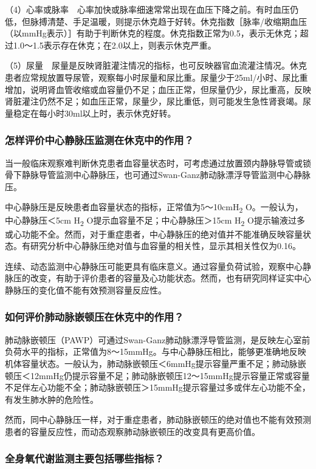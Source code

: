 （4）心率或脉率　心率加快或脉率细速常常出现在血压下降之前。有时血压仍低，但脉搏清楚、手足温暖，则提示休克趋于好转。休克指数［脉率/收缩期血压（以mmHg表示）］有助于判断休克的程度。休克指数正常为0.5，表示无休克；超过1.0～1.5表示存在休克；在2.0以上，则表示休克严重。

（5）尿量　尿量是反映肾脏灌注情况的指标，也可反映器官血流灌注情况。休克患者应常规放置导尿管，观察每小时尿量和尿比重。尿量少于25ml/小时、尿比重增加，说明肾血管收缩或血容量仍不足；血压正常，但尿量仍少，尿比重高，反映肾脏灌注仍然不足；如血压正常，尿量少，尿比重低，则可能发生急性肾衰竭。尿量稳定在每小时30ml以上时，表示休克好转。

\subsubsection{怎样评价中心静脉压监测在休克中的作用？}

当一般临床观察难判断休克患者血容量状态时，可考虑通过放置颈内静脉导管或锁骨下静脉导管监测中心静脉压，也可通过Swan-Ganz肺动脉漂浮导管监测中心静脉压。

中心静脉压是反映患者血容量状态的指标，正常值为5～10cmH\textsubscript{2}
O。一般认为，中心静脉压＜5cm H\textsubscript{2}
O提示血容量不足；中心静脉压＞15cm H\textsubscript{2}
O提示输液过多或心功能不全。然而，对于重症患者，中心静脉压的绝对值并不能准确反映容量状态。有研究分析中心静脉压绝对值与血容量的相关性，显示其相关性仅为0.16。

连续、动态监测中心静脉压可能更具有临床意义。通过容量负荷试验，观察中心静脉压的改变，有助于评价患者的容量及心功能状态。然而，也有研究同样证实中心静脉压的变化值不能有效预测容量反应性。

\subsubsection{如何评价肺动脉嵌顿压在休克中的作用？}

肺动脉嵌顿压（PAWP）可通过Swan-Ganz肺动脉漂浮导管监测，是反映左心室前负荷水平的指标，正常值为8～15mmHg。与中心静脉压相比，能够更准确地反映机体容量状态。一般认为，肺动脉嵌顿压＜6mmHg提示容量严重不足；肺动脉嵌顿压＜12mmHg仍提示容量不足；肺动脉嵌顿压12～15mmHg提示容量正常或容量不足伴左心功能不全；肺动脉嵌顿压＞15mmHg提示容量过多或伴左心功能不全，有发生肺水肿的危险性。

然而，同中心静脉压一样，对于重症患者，肺动脉嵌顿压的绝对值也不能有效预测患者的容量反应性，而动态观察肺动脉嵌顿压的改变具有更高价值。

\subsubsection{全身氧代谢监测主要包括哪些指标？}

